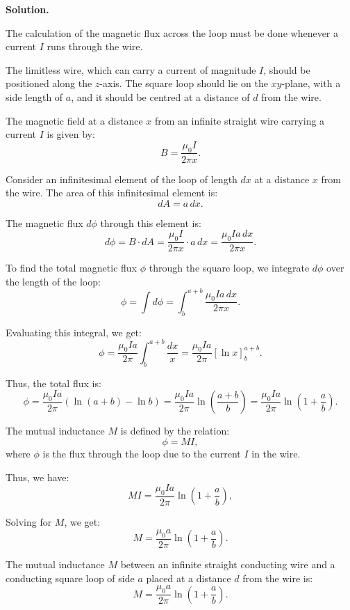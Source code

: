 \documentclass[12pt, a4paper, oneside]{report}
\newenvironment{solution}{
  \par\medskip\noindent
  \textbf{Solution.}\quad\itshape
  \par\noindent\makebox[\linewidth]{\rule{\textwidth}{0.4pt}}
}{
  \par\noindent\makebox[\linewidth]{\rule{\textwidth}{0.4pt}}
  \par\medskip
}
\begin{document}
\begin{solution}

The calculation of the magnetic flux across the loop must be done whenever a current \(I\) runs through the wire.

The limitless wire, which can carry a current of magnitude \(I\), should be positioned along the \(z\)-axis. The square loop should lie on the \(xy\)-plane, with a side length of \(a\), and it should be centred at a distance of \(d\) from the wire.


The magnetic field at a distance \(x\) from an infinite straight wire carrying a current \(I\) is given by:
\[
B = \frac{\mu_0 I}{2 \pi x}.
\]

Consider an infinitesimal element of the loop of length \(dx\) at a distance \(x\) from the wire. The area of this infinitesimal element is:
\[
dA = a \, dx.
\]

The magnetic flux \(d\phi\) through this element is:
\[
d\phi = B \cdot dA = \frac{\mu_0 I}{2 \pi x} \cdot a \, dx = \frac{\mu_0 I a \, dx}{2 \pi x}.
\]

To find the total magnetic flux \(\phi\) through the square loop, we integrate \(d\phi\) over the length of the loop:
\[
\phi = \int d\phi = \int_{b}^{a+b} \frac{\mu_0 I a \, dx}{2 \pi x}.
\]

Evaluating this integral, we get:
\[
\phi = \frac{\mu_0 I a}{2 \pi} \int_{b}^{a+b} \frac{dx}{x} = \frac{\mu_0 I a}{2 \pi} \left[ \ln x \right]_{b}^{a+b}.
\]

Thus, the total flux is:
\[
\phi = \frac{\mu_0 I a}{2 \pi} \left( \ln(a+b) - \ln b \right) = \frac{\mu_0 I a}{2 \pi} \ln \left( \frac{a+b}{b} \right) = \frac{\mu_0 I a}{2 \pi} \ln \left( 1 + \frac{a}{b} \right).
\]


The mutual inductance \(M\) is defined by the relation:
\[
\phi = M I,
\]
where \(\phi\) is the flux through the loop due to the current \(I\) in the wire.

Thus, we have:
\[
M I = \frac{\mu_0 I a}{2 \pi} \ln \left( 1 + \frac{a}{b} \right),
\]

Solving for \(M\), we get:
\[
M = \frac{\mu_0 a}{2 \pi} \ln \left( 1 + \frac{a}{b} \right).
\]


The mutual inductance \(M\) between an infinite straight conducting wire and a conducting square loop of side \(a\) placed at a distance \(d\) from the wire is:
\[
M = \frac{\mu_0 a}{2 \pi} \ln \left( 1 + \frac{a}{b} \right).
\]

\end{solution}
\end{document}
